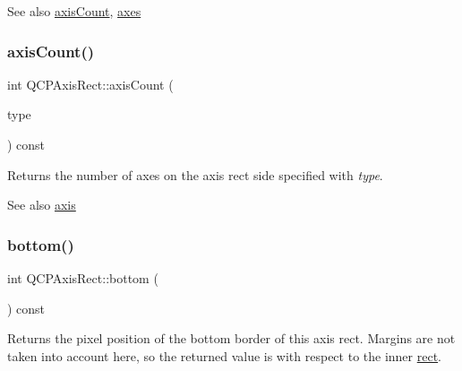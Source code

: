 \begin{DoxySeeAlso}{See also}
\hyperlink{classQCPAxisRect_a85b321acec0f694d8b5fdeafdbff3133}{axis\+Count}, \hyperlink{classQCPAxisRect_a8db4722cb93e9c4a6f0d91150c200867}{axes} 
\end{DoxySeeAlso}
\mbox{\label{classQCPAxisRect_a85b321acec0f694d8b5fdeafdbff3133}} 
\subsubsection{\texorpdfstring{axis\+Count()}{axisCount()}}
{\footnotesize\ttfamily int Q\+C\+P\+Axis\+Rect\+::axis\+Count (\begin{DoxyParamCaption}\item[{\hyperlink{classQCPAxis_ae2bcc1728b382f10f064612b368bc18a}{Q\+C\+P\+Axis\+::\+Axis\+Type}}]{type }\end{DoxyParamCaption}) const}

Returns the number of axes on the axis rect side specified with {\itshape type}.

\begin{DoxySeeAlso}{See also}
\hyperlink{classQCPAxisRect_a583ae4f6d78b601b732183f6cabecbe1}{axis} 
\end{DoxySeeAlso}
\mbox{\label{classQCPAxisRect_acefdf1abaa8a8ab681e906cc2be9581e}} 
\subsubsection{\texorpdfstring{bottom()}{bottom()}}
{\footnotesize\ttfamily int Q\+C\+P\+Axis\+Rect\+::bottom (\begin{DoxyParamCaption}{ }\end{DoxyParamCaption}) const\hspace{0.3cm}{\ttfamily [inline]}}

Returns the pixel position of the bottom border of this axis rect. Margins are not taken into account here, so the returned value is with respect to the inner \hyperlink{classQCPLayoutElement_a208effccfe2cca4a0eaf9393e60f2dd4}{rect}. \mbox{\label{classQCPAxisRect_ab15d4311d6535ccd7af504dc0e2b98c6}} 
